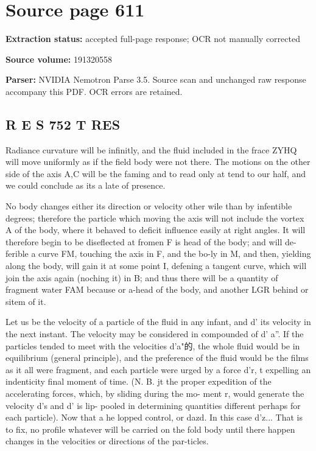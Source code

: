 \clearpage
\section{Source page 611}
\textbf{Extraction status:} accepted full-page response; OCR not manually corrected\par
\textbf{Source volume:} 191320558\par
\textbf{Parser:} NVIDIA Nemotron Parse 3.5. Source scan and unchanged raw response accompany this PDF. OCR errors are retained.\par\medskip
\subsection*{R E S 752 T RES}
Radiance curvature will be infinitly, and the fluid included in the frace ZYHQ will move uniformly as if the field body were not there. The motions on the other side of the axis A,C will be the faming and to read only at tend to our half, and we could conclude as its a late of presence.\par\medskip
No body changes either its direction or velocity other wile than by infentible degrees; therefore the particle which moving the axis will not include the vortex A of the body, where it behaved to deficit influence easily at right angles. It will therefore begin to be diseflected at fromen F is head of the body; and will de-ferible a curve FM, touching the axis in F, and the bo-ly in M, and then, yielding along the body, will gain it at some point I, defening a tangent curve, which will join the axis again (noching it) in B; and thus there will be a quantity of fragment water FAM because or a-head of the body, and another LGR behind or sitem of it.\par\medskip
Let us be the velocity of a particle of the fluid in any infant, and d’ its velocity in the next instant. The velocity may be considered in compounded of d’ a”. If the particles tended to meet with the velocities d’a"的, the whole fluid would be in equilibrium (general principle), and the preference of the fluid would be the films as it all were fragment, and each particle were urged by a force d’r, t expelling an indenticity final moment of time. (N. B. jt the proper expedition of the accelerating forces, which, by sliding during the mo- ment r, would generate the velocity d’s and d’ is lip- pooled in determining quantities different perhaps for each particle). Now that a he lopped control, or dazd. In this case d’z... That is to fix, no profile whatever will be carried on the fold body until there happen changes in the velocities or directions of the par-ticles.\par\medskip

